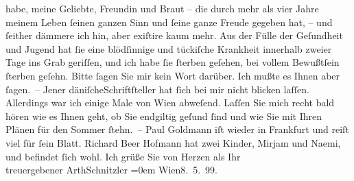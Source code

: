 \begin{ledgroupsized}[t]{13cm}
                    habe, meine Geliebte, Freundin und Braut – die durch mehr als vier Jahre meinem
                    Leben ſeinen ganzen Sinn und ſeine ganze Freude gegeben hat, – und ſeither
                    dämmere ich hin, aber exiſtire kaum mehr. Aus der Fülle der Geſundheit und
                    Jugend hat ſie eine blödſinnige und tückiſche Krankheit innerhalb zweier Tage
                    ins Grab geriſſen, und ich habe ſie ſterben geſehen, bei vollem Bewußt{\pb}ſein ſterben geſehn. Bitte ſagen Sie mir
                    kein Wort darüber. Ich mußte es Ihnen aber ſagen. –\pend
           \pstart
           Jener däniſcheSchriftſteller hat ſich bei
                    mir nicht blicken laſſen. Allerdings war ich einige Male von Wien abweſend. Laſſen Sie mich recht bald hören wie es
                    Ihnen geht, ob Sie endgiltig geſund ſind und wie Sie mit Ihren Plänen für den
                    Sommer ſtehn. –\pend
           \pstart
           Paul Goldmann iſt wieder in Frankfurt und reiſt viel für ſein Blatt.\pend
           \pstart
           {\pb}Richard Beer Hofmann hat zwei Kinder, Mirjam und Naemi, und befindet ſich
                    wohl.\pend
           \pstart
           Ich grüße Sie von Herzen als Ihr{\\[\baselineskip]}treuergebener
                        \spacefill\mbox{ArthSchnitzler}\pend
           \leftskip=0em{}\pstart
           Wien8. 5. 99.\pend
                     \endnumbering{}\end{ledgroupsized}  \newcommand{\dateiname}{L00915}\newcommand{\titel}{Arthur Schnitzler an Georg Brandes, 8. 5. 1899}\newcommand{\editorInnen}{Martin Anton Müller und Gerd-Hermann Susen}
      